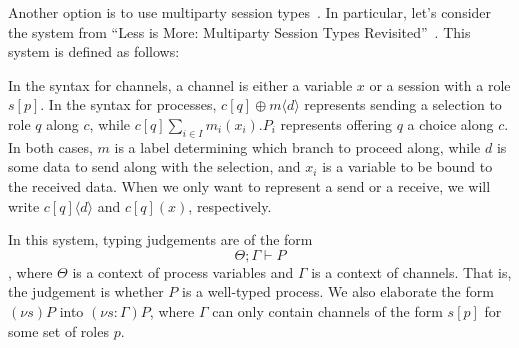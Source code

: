 \documentclass{article}
\theoremstyle{definition}
\newcommand{\proves}{\vdash}
\begin{document}
Another option is to use multiparty session types~\citep{ScalasY19}.
In particular, let's consider the system from ``Less is More: Multiparty Session Types Revisited''~\citep{ScalasY19}.
This system is defined as follows:
\begin{syntax}
    
     
    
\end{syntax}
In the syntax for channels, a channel is either a variable $x$ or a session with a role $s[p]$.
In the syntax for processes, $c[q]\oplus m\langle d\rangle$ represents sending a selection to role $q$ along $c$, while $c[q]\sum_{i \in I} m_i(x_i).P_i$ represents offering $q$ a choice along $c$.
In both cases, $m$ is a label determining which branch to proceed along, while $d$ is some data to send along with the selection, and $x_i$ is a variable to be bound to the received data.
When we only want to represent a send or a receive, we will write $c[q]\langle d \rangle$ and $c[q](x)$, respectively.

In this system, typing judgements are of the form $$\Theta; \Gamma \proves P$$, where $\Theta$ is a context of process variables and $\Gamma$ is a context of channels.
That is, the judgement is whether $P$ is a well-typed process.
We also elaborate the form $(\nu s) P$ into $(\nu s : \Gamma) P$, where $\Gamma$ can only contain channels of the form $s[p]$ for some set of roles $p$.
\end{document}
